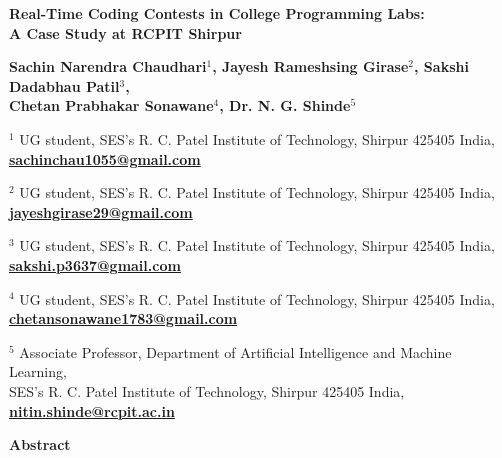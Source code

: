 \documentclass[12pt,a4paper]{article}
\begin{document}
\begin{center}
  {\selectfont\textbf{\fontsize{16pt}{20pt}\selectfont Real-Time Coding Contests in College Programming Labs:\\[3pt] A Case Study at RCPIT Shirpur}}\par
  \vspace{8pt}
  {\fontsize{12pt}{15pt}\selectfont\textbf{Sachin Narendra Chaudhari$^{1}$, Jayesh Rameshsing Girase$^{2}$, Sakshi Dadabhau Patil$^{3}$,\\[2pt] Chetan Prabhakar Sonawane$^{4}$, Dr. N. G. Shinde$^{5}$}}\par
  \vspace{7pt}
  {\fontsize{10pt}{13pt}\selectfont
  $^{1}$ UG student, SES's R. C. Patel Institute of Technology, Shirpur 425405 India,
  {\color{linkblue}\underline{\textbf{sachinchau1055@gmail.com}}}\par
  \vspace{2pt}
  $^{2}$ UG student, SES's R. C. Patel Institute of Technology, Shirpur 425405 India,
  {\color{linkblue}\underline{\textbf{jayeshgirase29@gmail.com}}}\par
  \vspace{2pt}
  $^{3}$ UG student, SES's R. C. Patel Institute of Technology, Shirpur 425405 India,
  {\color{linkblue}\underline{\textbf{sakshi.p3637@gmail.com}}}\par
  \vspace{2pt}
  $^{4}$ UG student, SES's R. C. Patel Institute of Technology, Shirpur 425405 India,
  {\color{linkblue}\underline{\textbf{chetansonawane1783@gmail.com}}}\par
  \vspace{2pt}
  $^{5}$ Associate Professor, Department of Artificial Intelligence and Machine Learning,\\[1pt]
  SES's R. C. Patel Institute of Technology, Shirpur 425405 India,
  {\color{linkblue}\underline{\textbf{nitin.shinde@rcpit.ac.in}}}\par
  }\par
\end{center}

\vspace{3pt}

\textbf{\fontsize{12pt}{14pt}\selectfont Abstract}
\end{document}
